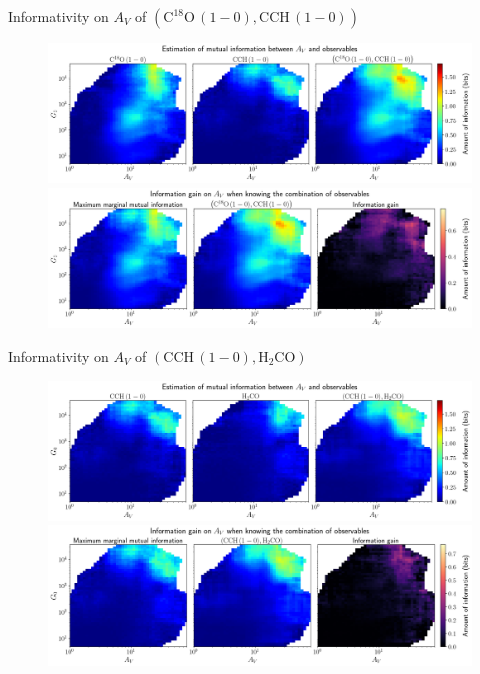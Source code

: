 \documentclass{beamer}
\begin{document}
\begin{frame}{Informativity on $A_V$ of $\left(\mathrm{C^{18}O\,(1-0)},\mathrm{CCH\,(1-0)}\right)$}
    \begin{figure}
        \centering
        \includegraphics[width=0.95\linewidth]{../mi/av__c18o10_cch10_mi.png}
        \vfill
        \includegraphics[width=0.95\linewidth]{../mi/av__c18o10_cch10_mi_gain.png}
    \end{figure}
\end{frame}

\begin{frame}{Informativity on $A_V$ of $\left(\mathrm{CCH\,(1-0)},\mathrm{H_2CO}\right)$}
    \begin{figure}
        \centering
        \includegraphics[width=0.95\linewidth]{../mi/av__cch10_h2co_mi.png}
        \vfill
        \includegraphics[width=0.95\linewidth]{../mi/av__cch10_h2co_mi_gain.png}
    \end{figure}
\end{frame}
\end{document}
